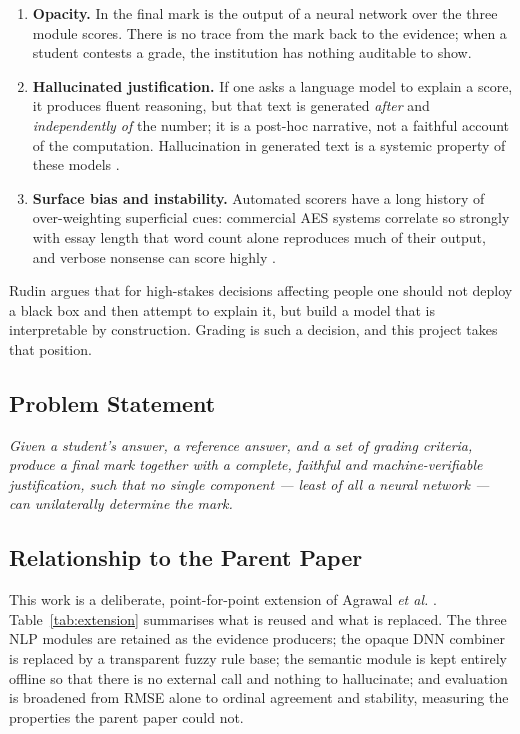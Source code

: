 \documentclass[11pt,a4paper]{article}
\begin{document}
\begin{enumerate}[leftmargin=1.4em,itemsep=0.3em]
  \item \textbf{Opacity.} In \cite{agrawal2024} the final mark is the output of a
  neural network over the three module scores. There is no trace from the mark
  back to the evidence; when a student contests a grade, the institution has
  nothing auditable to show.

  \item \textbf{Hallucinated justification.} If one asks a language model to
  explain a score, it produces fluent reasoning, but that text is generated
  \emph{after} and \emph{independently of} the number; it is a post-hoc narrative,
  not a faithful account of the computation. Hallucination in generated text is a
  systemic property of these models \cite{ji2023hallucination}.

  \item \textbf{Surface bias and instability.} Automated scorers have a long
  history of over-weighting superficial cues: commercial AES systems correlate so
  strongly with essay length that word count alone reproduces much of their
  output, and verbose nonsense can score highly \cite{ke2019}.
\end{enumerate}

Rudin \cite{rudin2019} argues that for high-stakes decisions affecting people one
should not deploy a black box and then attempt to explain it, but build a model
that is interpretable by construction. Grading is such a decision, and this
project takes that position.

\subsection{Problem Statement}

\emph{Given a student's answer, a reference answer, and a set of grading criteria,
produce a final mark together with a complete, faithful and machine-verifiable
justification, such that no single component --- least of all a neural network ---
can unilaterally determine the mark.}

\subsection{Relationship to the Parent Paper}

This work is a deliberate, point-for-point extension of Agrawal \emph{et al.}
\cite{agrawal2024}. Table~\ref{tab:extension} summarises what is reused and what
is replaced. The three NLP modules are retained as the evidence producers; the
opaque DNN combiner is replaced by a transparent fuzzy rule base; the semantic
module is kept entirely offline so that there is no external call and nothing to
hallucinate; and evaluation is broadened from RMSE alone to ordinal agreement and
stability, measuring the properties the parent paper could not.
\end{document}
